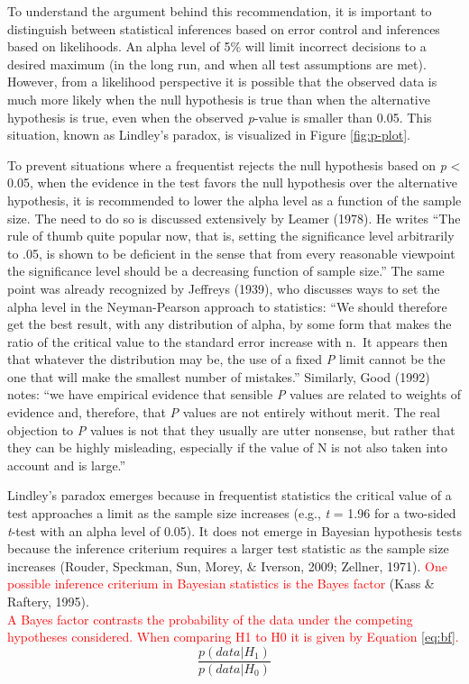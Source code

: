 \documentclass[
  english,
  ,man, a4paper,floatsintext]{apa6}
\begin{document}
To understand the argument behind this recommendation, it is important to distinguish between statistical inferences based on error control and inferences based on likelihoods. An alpha level of 5\% will limit incorrect decisions to a desired maximum (in the long run, and when all test assumptions are met). However, from a likelihood perspective it is possible that the observed data is much more likely when the null hypothesis is true than when the alternative hypothesis is true, even when the observed \emph{p}-value is smaller than 0.05. This situation, known as Lindley's paradox, is visualized in Figure \ref{fig:p-plot}.

To prevent situations where a frequentist rejects the null hypothesis based on \emph{p} \textless{} 0.05, when the evidence in the test favors the null hypothesis over the alternative hypothesis, it is recommended to lower the alpha level as a function of the sample size. The need to do so is discussed extensively by Leamer (1978). He writes ``The rule of thumb quite popular now, that is, setting the significance level arbitrarily to .05, is shown to be deficient in the sense that from every reasonable viewpoint the significance level should be a decreasing function of sample size.'' The same point was already recognized by Jeffreys (1939), who discusses ways to set the alpha level in the Neyman-Pearson approach to statistics: ``We should therefore get the best result, with any distribution of alpha, by some form that makes the ratio of the critical value to the standard error increase with n.~It appears then that whatever the distribution may be, the use of a fixed \emph{P} limit cannot be the one that will make the smallest number of mistakes.'' Similarly, Good (1992) notes: ``we have empirical evidence that sensible \emph{P} values are related to weights of evidence and, therefore, that \emph{P} values are not entirely without merit. The real objection to \emph{P} values is not that they usually are utter nonsense, but rather that they can be highly misleading, especially if the value of N is not also taken into account and is large.''

Lindley's paradox emerges because in frequentist statistics the critical value of a test approaches a limit as the sample size increases (e.g., \emph{t} = 1.96 for a two-sided \emph{t}-test with an alpha level of 0.05). It does not emerge in Bayesian hypothesis tests because the inference criterium requires a larger test statistic as the sample size increases (Rouder, Speckman, Sun, Morey, \& Iverson, 2009; Zellner, 1971). \textcolor{red}{One possible inference criterium in Bayesian statistics is the Bayes factor} (Kass \& Raftery, 1995).\\
\textcolor{red}{A Bayes factor contrasts the probability of the data under the competing hypotheses considered. When comparing H1 to H0 it is given by Equation \ref{eq:bf}.}
\begin{equation}
\frac{p(data|H_1)}{p(data|H_0)}
\label{eq:bf}
\end{equation}
\end{document}
